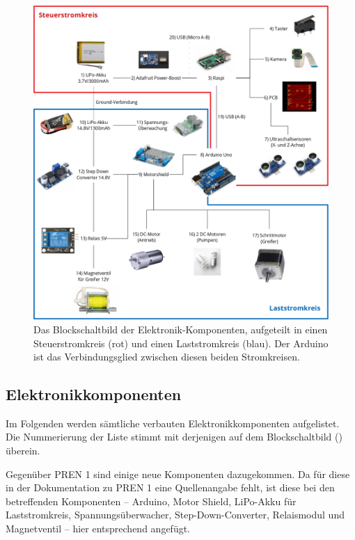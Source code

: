 \begin{figure}
    \centering
    \includegraphics[width=\textwidth]{graphs/blockschaltbild.png}
    \caption{Das Blockschaltbild der Elektronik-Komponenten, aufgeteilt in einen Steuerstromkreis (rot) und einen Laststromkreis (blau). Der Arduino ist das Verbindungsglied zwischen diesen beiden Stromkreisen.}
    \label{fig:blockschaltbild}
\end{figure}

\subsection{Elektronikkomponenten}

Im Folgenden werden sämtliche verbauten Elektronikkomponenten aufgelistet. Die Nummerierung der Liste stimmt mit derjenigen auf dem Blockschaltbild () überein.

Gegenüber PREN 1 sind einige neue Komponenten dazugekommen. Da für diese in der Dokumentation zu PREN 1 \cite[S. 50]{pren1} eine Quellenangabe fehlt, ist diese bei den betreffenden Komponenten -- Arduino, Motor Shield, LiPo-Akku für Laststromkreis, Spannungsüberwacher, Step-Down-Converter, Relaismodul und Magnetventil -- hier entsprechend angefügt.

